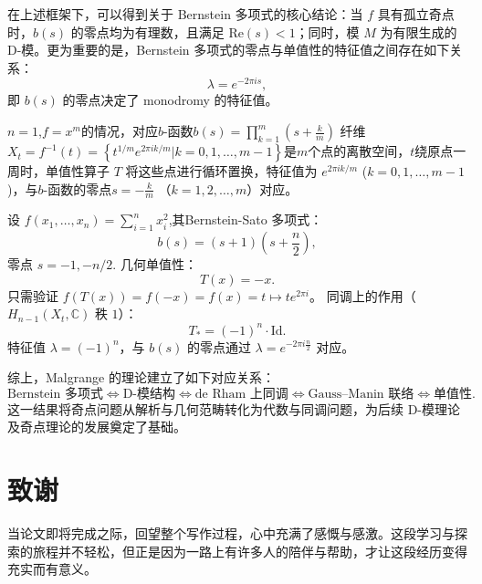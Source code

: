 \documentclass[12pt,a4paper]{ctexrep}   %
\newcommand{\centerchapter}{\ctexset{chapter={format=\centering\zihao{3}\bfseries}}}
\begin{document}
在上述框架下，可以得到关于 Bernstein 多项式的核心结论：当 $f$ 具有孤立奇点时，$b(s)$ 的零点均为有理数，且满足 $\mathrm{Re}(s) < 1$；同时，模 $M$ 为有限生成的 D-模。更为重要的是，Bernstein 多项式的零点与单值性的特征值之间存在如下关系：
\begin{equation*}
    \lambda = e^{-2\pi i s},
\end{equation*}
即 $b(s)$ 的零点决定了 monodromy 的特征值。


\begin{example}
    $n=1$,$f=x^m$的情况，对应$b$-函数$b(s) =\prod_{k=1}^m (s+\frac{k}{m})$
    纤维$X_t=f^{-1}(t)=\left\{t^{1/m}e^{2\pi i k/m}|k=0,1,\ldots,m-1\right\}$是$m$个点的离散空间，$t$绕原点一周时，单值性算子 $T$ 将这些点进行循环置换，特征值为 $e^{2\pi i k/m}$ ($k=0,1,\ldots,m-1$)，与$b$-函数的零点$s=-\frac{k}{m}$ （$k=1,2,\ldots,m$）对应。
\end{example}

\begin{example}
    设 \(f(x_1,\dots,x_n) = \sum_{i=1}^n x_i^2\),其Bernstein-Sato 多项式：
    \[
        b(s) = (s+1)\left(s + \frac{n}{2}\right),
    \]
    零点 \(s = -1, -n/2\).
    几何单值性：
    \[
        T(x) = -x.
    \]
    只需验证 \(f(T(x)) = f(-x) = f(x) = t \mapsto t e^{2\pi i}\)。
    同调上的作用（\(H_{n-1}(X_t, \mathbb{C})\) 秩 $1$）：
    \[
        T_* = (-1)^n \cdot \mathrm{Id}.
    \]
    特征值 \(\lambda = (-1)^n\)，与 \(b(s)\) 的零点通过 $\lambda = e^{-2\pi i
                \frac{n}{2}}$ 对应。

\end{example}


综上，Malgrange 的理论建立了如下对应关系：
\[
    \text{Bernstein 多项式}
    \Longleftrightarrow
    \text{D-模结构}
    \Longleftrightarrow
    \text{de Rham 上同调}
    \Longleftrightarrow
    \text{Gauss--Manin 联络}
    \Longleftrightarrow
    \text{单值性}.
\]
这一结果将奇点问题从解析与几何范畴转化为代数与同调问题，为后续 D-模理论及奇点理论的发展奠定了基础。






\centerchapter
\chapter*{致谢}
当论文即将完成之际，回望整个写作过程，心中充满了感慨与感激。这段学习与探索的旅程并不轻松，但正是因为一路上有许多人的陪伴与帮助，才让这段经历变得充实而有意义。
\end{document}
